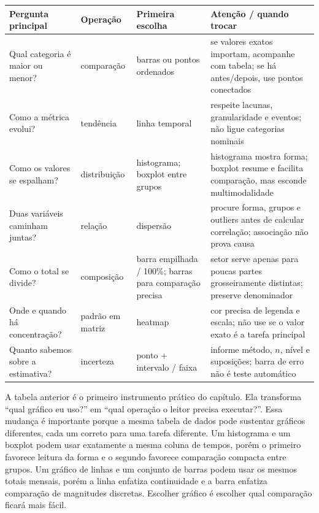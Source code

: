 \begin{center}
\small
\begin{tabularx}{0.96\textwidth}{p{3.2cm} p{2.3cm} X X}
\toprule
\textbf{Pergunta principal} & \textbf{Operação} & \textbf{Primeira escolha} & \textbf{Atenção / quando trocar} \\
\midrule
Qual categoria é maior ou menor? & comparação & barras ou pontos ordenados & se valores exatos importam, acompanhe com tabela; se há antes/depois, use pontos conectados \\
Como a métrica evolui? & tendência & linha temporal & respeite lacunas, granularidade e eventos; não ligue categorias nominais \\
Como os valores se espalham? & distribuição & histograma; boxplot entre grupos & histograma mostra forma; boxplot resume e facilita comparação, mas esconde multimodalidade \\
Duas variáveis caminham juntas? & relação & dispersão & procure forma, grupos e outliers antes de calcular correlação; associação não prova causa \\
Como o total se divide? & composição & barra empilhada / 100\%; barras para comparação precisa & setor serve apenas para poucas partes grosseiramente distintas; preserve denominador \\
Onde e quando há concentração? & padrão em matriz & heatmap & cor precisa de legenda e escala; não use se o valor exato é a tarefa principal \\
Quanto sabemos sobre a estimativa? & incerteza & ponto + intervalo / faixa & informe método, $n$, nível e suposições; barra de erro não é teste automático \\
\bottomrule
\end{tabularx}
\end{center}

A tabela anterior é o primeiro instrumento prático do capítulo. Ela transforma ``qual gráfico eu uso?'' em ``qual operação o leitor precisa executar?''. Essa mudança é importante porque a mesma tabela de dados pode sustentar gráficos diferentes, cada um correto para uma tarefa diferente. Um histograma e um boxplot podem usar exatamente a mesma coluna de tempos, porém o primeiro favorece leitura da forma e o segundo favorece comparação compacta entre grupos. Um gráfico de linhas e um conjunto de barras podem usar os mesmos totais mensais, porém a linha enfatiza continuidade e a barra enfatiza comparação de magnitudes discretas. Escolher gráfico é escolher qual comparação ficará mais fácil.

